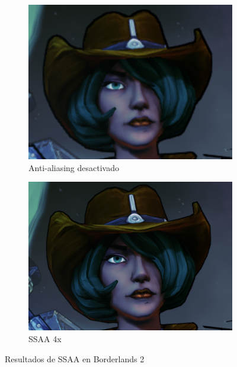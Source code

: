 \documentclass[withindex, glossary]{cam-thesis}
\begin{document}
\begin{figure}[!htbp]
    \centering
    \begin{subfigure}[b]{0.8\textwidth}
        \includegraphics[width=\textwidth]{figures/ss1off.png}
        \caption{Anti-aliasing desactivado}
    \end{subfigure}
    \centering
    \begin{subfigure}[b]{0.8\textwidth}
        \includegraphics[width=\textwidth]{figures/ss1on.png}
        \caption{SSAA 4x}
    \end{subfigure}
    \caption{Resultados de SSAA en Borderlands 2\label{ss1}}
\end{figure}
\end{document}
